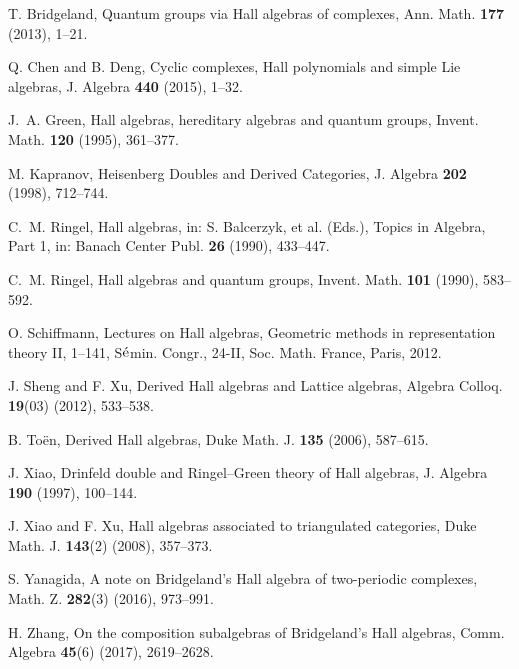 \documentclass[reqno,12pt]{amsart}
\numberwithin{equation}{section}
\theoremstyle{plain}
\theoremstyle{definition}
\begin{document}
\begin{thebibliography}{99}

 T. Bridgeland, {Quantum groups via Hall algebras of complexes},
{Ann. Math.} {\bf 177} (2013), 1--21.

 Q. Chen and B. Deng, {Cyclic complexes, Hall polynomials and simple Lie algebras}, J. Algebra {\bf 440} (2015), 1--32.

 J.~A. Green,
{Hall algebras, hereditary algebras and quantum groups}, Invent.
Math. {\bf 120} (1995), 361--377.

 M. Kapranov, {Heisenberg Doubles and Derived Categories}, J. Algebra {\bf 202} (1998), 712--744.

 C.~M. Ringel, {Hall algebras}, in: S. Balcerzyk, et al. (Eds.), Topics in Algebra, Part 1, in: Banach Center Publ. {\bf 26} (1990), 433--447.

 C.~M. Ringel, {Hall algebras and quantum groups},
Invent. Math. {\bf 101} (1990), 583--592.

 O. Schiffmann, {Lectures on Hall algebras},
Geometric methods in representation theory II,  1--141, S$\acute{\rm e}$min. Congr., 24-II,
Soc. Math. France, Paris, 2012.

 J. Sheng and F. Xu, {Derived Hall algebras and Lattice algebras}, Algebra Colloq. {\bf 19}(03) (2012), 533--538.

 B. To\"en, {Derived Hall algebras}, Duke Math.
J. {\bf 135} (2006), 587--615.

 J. Xiao, {Drinfeld double and Ringel--Green theory of Hall
algebras}, J. Algebra {\bf190} (1997), 100--144.

 J. Xiao and F. Xu, {Hall algebras associated to triangulated categories}, Duke Math. J. {\bf 143}(2) (2008), 357--373.

 S. Yanagida, {A note on Bridgeland's Hall algebra of two-periodic complexes}, Math. Z. {\bf 282}(3) (2016), 973--991.

 H. Zhang, {On the composition subalgebras of  Bridgeland's Hall algebras}, Comm. Algebra {\bf 45}(6) (2017), 2619--2628.
\end{thebibliography}
\end{document}
